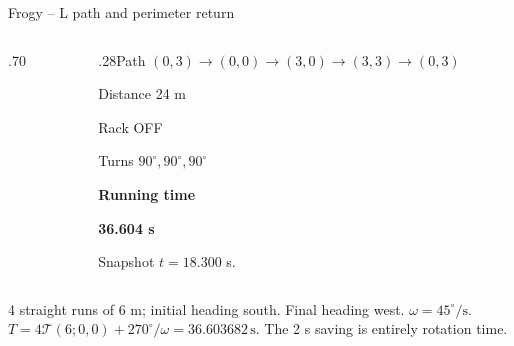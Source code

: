 \begin{frame}{Frogy -- L path and perimeter return}
\begin{columns}[T,onlytextwidth]
\begin{column}{.70\textwidth}\end{column}
\begin{column}{.28\textwidth}\small Path $(0,3)\to(0,0)\to(3,0)\to(3,3)\to(0,3)$\par\medskip Distance 24 m\par Rack OFF\par Turns $90^\circ,90^\circ,90^\circ$\par\medskip\textbf{Running time}\par\textbf{36.604 s}\par\medskip Snapshot $t=18.300$ s.\end{column}
\end{columns}
\vspace{1mm}
{\tiny\texttt{}\par
\texttt{}\par
4 straight runs of 6 m; initial heading south. Final heading west. $\omega=45^\circ/\mathrm{s}$. $T=4\mathcal T(6;0,0)+270^\circ/\omega=36.603682\,\mathrm{s}$. The 2 s saving is entirely rotation time.}
\end{frame}

